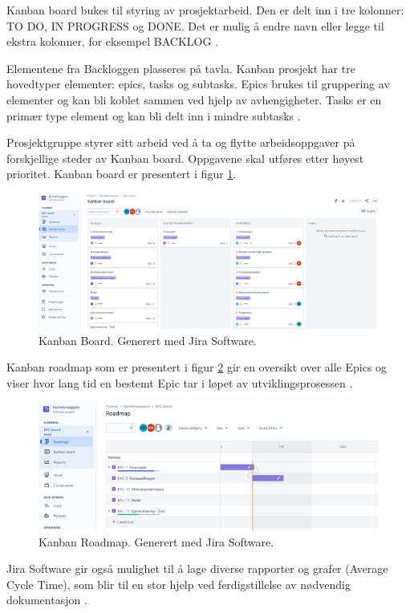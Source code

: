 Kanban board bukes til styring av prosjektarbeid. Den er delt inn i tre kolonner: TO DO, IN PROGRESS og DONE. Det er mulig å endre navn eller legge til ekstra kolonner, for eksempel BACKLOG \cite{4-atlassian.com-jira}.

Elementene fra Backloggen plasseres på tavla. Kanban prosjekt har tre hovedtyper elementer: epics, tasks og subtasks. Epics brukes til gruppering av elementer og kan bli koblet sammen ved hjelp av avhengigheter. Tasks er en primær type element og kan bli delt inn i mindre subtasks \cite{4-atlassian.com-jira}.

Prosjektgruppe styrer sitt arbeid ved å ta og flytte arbeidsoppgaver på forskjellige steder av Kanban board. Oppgavene skal utføres etter høyest prioritet. Kanban board er presentert i figur \ref{figur:kanban-board}.

\begin{figure}[ht]
\centering
\includegraphics{images/kanban-board3.png}
\caption{Kanban Board. Generert med Jira Software.}
\label{figur:kanban-board}
\end{figure} 

\newpage
Kanban roadmap som er presentert i figur \ref{figur:kanban-roadmap} gir en oversikt over alle Epics og viser hvor lang tid en bestemt Epic tar i løpet av utviklingsprosessen \cite{4-atlassian.com-jira}.   

\begin{figure}[ht]
\centering
\includegraphics{images/kanban-roadmap3.png}
\caption{Kanban Roadmap. Generert med Jira Software.}
\label{figur:kanban-roadmap}
\end{figure} 

Jira Software gir også mulighet til å lage diverse rapporter og grafer (Average Cycle Time), som blir til en stor hjelp ved ferdigstillelse av nødvendig dokumentasjon \cite{4-atlassian.com-jira}.

